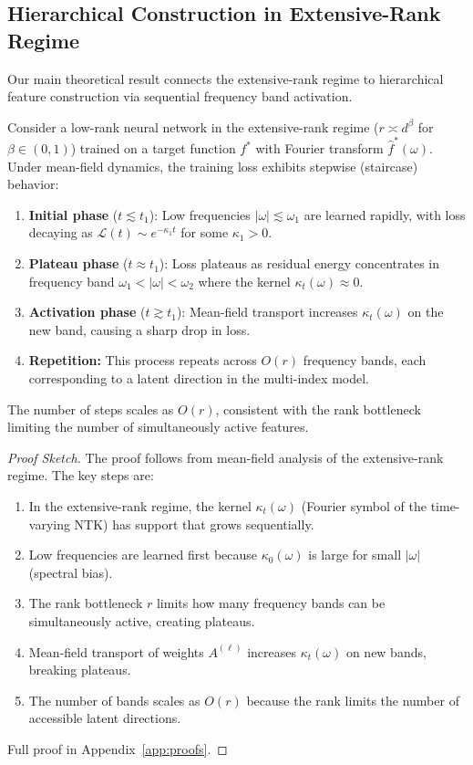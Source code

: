 \subsection{Hierarchical Construction in Extensive-Rank Regime}

Our main theoretical result connects the extensive-rank regime to hierarchical feature construction via sequential frequency band activation.

\begin{theorem}
\label{thm:hierarchical-construction}
Consider a low-rank neural network in the extensive-rank regime ($r \asymp d^\beta$ for $\beta \in (0,1)$) trained on a target function $f^*$ with Fourier transform $\hat{f}^*(\omega)$. Under mean-field dynamics, the training loss exhibits stepwise (staircase) behavior:
\begin{enumerate}
    \item \textbf{Initial phase} ($t \lesssim t_1$): Low frequencies $|\omega| \lesssim \omega_1$ are learned rapidly, with loss decaying as $\mathcal{L}(t) \sim e^{-\kappa_1 t}$ for some $\kappa_1 > 0$.
    \item \textbf{Plateau phase} ($t \approx t_1$): Loss plateaus as residual energy concentrates in frequency band $\omega_1 < |\omega| < \omega_2$ where the kernel $\kappa_t(\omega) \approx 0$.
    \item \textbf{Activation phase} ($t \gtrsim t_1$): Mean-field transport increases $\kappa_t(\omega)$ on the new band, causing a sharp drop in loss.
    \item \textbf{Repetition:} This process repeats across $O(r)$ frequency bands, each corresponding to a latent direction in the multi-index model.
\end{enumerate}
The number of steps scales as $O(r)$, consistent with the rank bottleneck limiting the number of simultaneously active features.
\end{theorem}

\begin{proof}[Proof Sketch]
The proof follows from mean-field analysis of the extensive-rank regime. The key steps are:
\begin{enumerate}
    \item In the extensive-rank regime, the kernel $\kappa_t(\omega)$ (Fourier symbol of the time-varying NTK) has support that grows sequentially.
    \item Low frequencies are learned first because $\kappa_0(\omega)$ is large for small $|\omega|$ (spectral bias).
    \item The rank bottleneck $r$ limits how many frequency bands can be simultaneously active, creating plateaus.
    \item Mean-field transport of weights $A^{(\ell)}$ increases $\kappa_t(\omega)$ on new bands, breaking plateaus.
    \item The number of bands scales as $O(r)$ because the rank limits the number of accessible latent directions.
\end{enumerate}
Full proof in Appendix~\ref{app:proofs}.
\end{proof}

